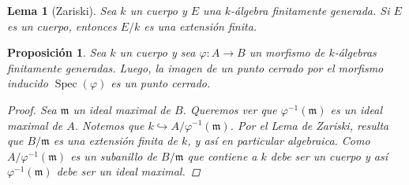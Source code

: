 \documentclass[11pt,a4paper, spanish,oneside,fleqn]{article}
\newtheorem{lem}[teo]{Lema}
\newtheorem{prop}[teo]{Proposición}
\theoremstyle{definition}
\DeclareMathOperator{\spec}{Spec}
\begin{document}
\begin{lem}[Zariski]
Sea $k$ un cuerpo y $E$ una $k$-álgebra finitamente generada. Si $E$ es un cuerpo, entonces $E/k$ es una extensión finita.
\end{lem}

\begin{prop}
Sea $k$ un cuerpo y sea $\varphi:A\to B$ un morfismo de $k$-álgebras finitamente generadas. Luego, la imagen de un punto cerrado por el morfismo inducido $\spec(\varphi)$ es un punto cerrado.
\begin{proof}
Sea $\mathfrak{m}$ un ideal maximal de $B$. Queremos ver que $\varphi^{-1}(\mathfrak{m})$ es un ideal maximal de $A$. Notemos que $k\hookrightarrow A/\varphi^{-1}(\mathfrak{m})$. Por el Lema de Zariski, resulta que $B/\mathfrak{m}$ es una extensión finita de $k$, y así en particular algebraica. Como $A/\varphi^{-1}(\mathfrak{m})$ es un subanillo de $B/\mathfrak{m}$ que contiene a $k$ debe ser un cuerpo y así $\varphi^{-1}(\mathfrak{m})$ debe ser un ideal maximal.
\end{proof}
\end{prop}
\end{document}
